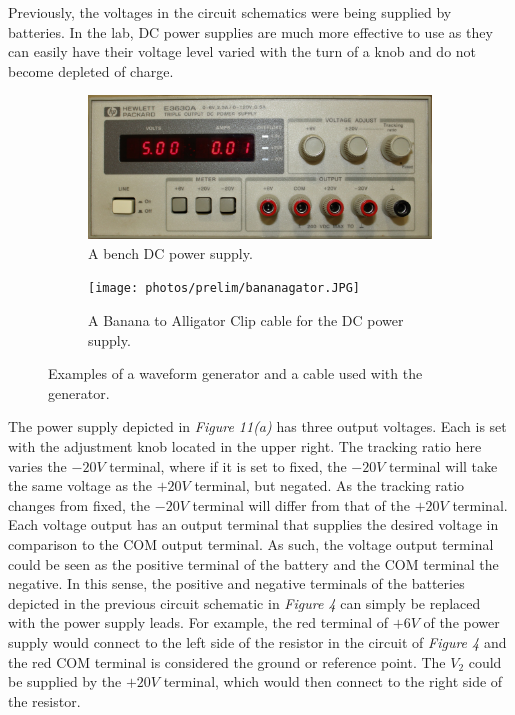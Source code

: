 \documentclass[12pt]{article}
\begin{document}
Previously, the voltages in the circuit schematics were being supplied by batteries. In the lab, DC power supplies are much more effective to use as they can easily have their voltage level varied with the turn of a knob and do not become depleted of charge. 

\begin{figure}[H]
\begin{subfigure}{.5\textwidth}
    \centering
    \includegraphics[width=1\linewidth]{photos/prelim/powersupply.jpg}
    \caption{A bench DC power supply.}
\end{subfigure}%
\begin{subfigure}{.5\textwidth}
  \centering
  \texttt{[image: photos/prelim/bananagator.JPG]}
  \caption{A Banana to Alligator Clip cable for the DC power supply.}
\end{subfigure}
\caption{Examples of a waveform generator and a cable used with the generator.}
\end{figure}

The power supply depicted in \textit{Figure 11(a)} has three output voltages. Each is set with the adjustment knob located in the upper right. The tracking ratio here varies the $-20V$ terminal, where if it is set to fixed, the $-20V$ terminal will take the same voltage as the $+20V$ terminal, but negated. As the tracking ratio changes from fixed, the $-20V$ terminal will differ from that of the $+20V$ terminal. Each voltage output has an output terminal that supplies the desired voltage in comparison to the COM output terminal. As such, the voltage output terminal could be seen as the positive terminal of the battery and the COM terminal the negative. In this sense, the positive and negative terminals of the batteries depicted in the previous circuit schematic in \textit{Figure 4} can simply be replaced with the power supply leads. For example, the red terminal of $+6V$ of the power supply would connect to the left side of the resistor in the circuit of \textit{Figure 4} and the red COM terminal is considered the ground or reference point. The $V_2$ could be supplied by the $+20V$ terminal, which would then connect to the right side of the resistor.
\end{document}
